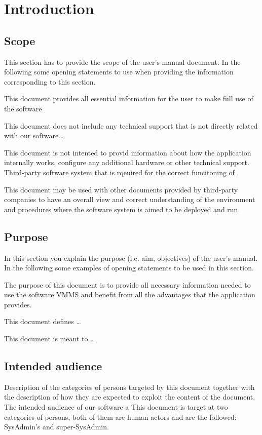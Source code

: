 \chapter{Introduction}
\label{chap:introduction}

\section{Scope}
 
This section has to provide the scope of the user's manual document.
In the following some opening statements to use when providing the
information corresponding to this section.

This document provides all essential information for the user to make full
use of the software \mysystemname


This document does not include any technical support that is not directly
related with our software.\ldots
 
This document is not intented to provid information about how the application
internally works, configure any additional hardware or other technical
support. Third-party software system that is rqeuired for the correct
funcitoning of \mysystemname.

 
This document may be used with other documents provided by third-party
companies to have an overall view and correct understanding of the environment
and procedures where the software system \mysystemname is aimed to be deployed
and run.




\section{Purpose}
In this section you explain the purpose (i.e. aim, objectives) of the user's
manual. In the following some examples of opening statements to be used in this
section.

The purpose of this document is to provide all necessary information
needed to use the software VMMS and benefit from all the advantages that the
application provides.

This document defines \ldots

This document is meant to \ldots



\section{Intended audience}
Description of the categories of persons targeted by this document together with the description of how they are expected to exploit the content of the document.
The intended audience of our software a
This document is target at two categories of persons, both of them are human
actors and are the followed: SysAdmin's and super-SysAdmin.\\\\


